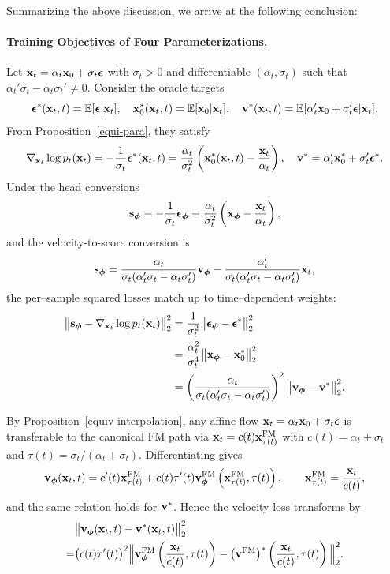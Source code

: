 Summarizing the above discussion, we arrive at the following conclusion:



\paragraph{Training Objectives of Four Parameterizations.}
Let ${\mathbf{x}}_t=\alpha_t {\mathbf{x}}_0+\sigma_t {\bm{\epsilon}}$ with $\sigma_t>0$ and differentiable $(\alpha_t,\sigma_t)$ such that $\alpha_t'\sigma_t-\alpha_t\sigma_t'\neq 0$. Consider the oracle targets
\[
{\bm{\epsilon}}^*({\mathbf{x}}_t,t)=\mathbb{E}[{\bm{\epsilon}}|{\mathbf{x}}_t],\quad 
{\mathbf{x}}_0^*({\mathbf{x}}_t,t)=\mathbb{E}[{\mathbf{x}}_0|{\mathbf{x}}_t],\quad
{\mathbf{v}}^*({\mathbf{x}}_t,t)=\mathbb{E}[\alpha_t'{\mathbf{x}}_0+\sigma_t'{\bm{\epsilon}}|{\mathbf{x}}_t].
\]
From Proposition~\ref{equi-para}, they satisfy
\[
\nabla_{{\mathbf{x}}_t}\log p_t({\mathbf{x}}_t)
= -\frac{1}{\sigma_t} {\bm{\epsilon}}^*({\mathbf{x}}_t,t)
= \frac{\alpha_t}{\sigma_t^2} \left({\mathbf{x}}_0^*({\mathbf{x}}_t,t)-\frac{{\mathbf{x}}_t}{\alpha_t}\right),
\quad
{\mathbf{v}}^*=\alpha_t' {\mathbf{x}}_0^*+\sigma_t' {\bm{\epsilon}}^*.
\]
Under the head conversions
\[
{\mathbf{s}}_{{\bm{\phi}}} \equiv -\frac{1}{\sigma_t} {\bm{\epsilon}}_{{\bm{\phi}}}
\equiv \frac{\alpha_t}{\sigma_t^2} \left({\mathbf{x}}_{{\bm{\phi}}}-\frac{{\mathbf{x}}_t}{\alpha_t}\right),
\]
and the velocity-to-score conversion is
\[
{\mathbf{s}}_{{\bm{\phi}}}
= \frac{\alpha_t}{\sigma_t(\alpha_t'\sigma_t-\alpha_t\sigma_t')} {\mathbf{v}}_{{\bm{\phi}}}
- \frac{\alpha_t'}{\sigma_t(\alpha_t'\sigma_t-\alpha_t\sigma_t')} {\mathbf{x}}_t,
\]
the per–sample squared losses match up to time–dependent weights:
\begin{align}\label{eq:s-e-x-v-equi}
\begin{aligned}
\big\|{\mathbf{s}}_{{\bm{\phi}}}-\nabla_{{\mathbf{x}}_t}\log p_t({\mathbf{x}}_t)\big\|_2^2
&=\frac{1}{\sigma_t^2} \big\|{\bm{\epsilon}}_{{\bm{\phi}}}-{\bm{\epsilon}}^*\big\|_2^2 \\
&=\frac{\alpha_t^2}{\sigma_t^4} \big\|{\mathbf{x}}_{{\bm{\phi}}}-{\mathbf{x}}_0^*\big\|_2^2 \\
&=\left(\frac{\alpha_t}{\sigma_t(\alpha_t'\sigma_t-\alpha_t\sigma_t')}\right)^{ 2}
\big\|{\mathbf{v}}_{{\bm{\phi}}}-{\mathbf{v}}^*\big\|_2^2 .
\end{aligned}
\end{align}

By Proposition~\ref{equiv-interpolation}, any affine flow ${\mathbf{x}}_t=\alpha_t{\mathbf{x}}_0+\sigma_t{\bm{\epsilon}}$
is transferable to the canonical FM path via ${\mathbf{x}}_t=c(t){\mathbf{x}}^{\mathrm{FM}}_{\tau(t)}$ with
$c(t)=\alpha_t+\sigma_t$ and $\tau(t)=\sigma_t/(\alpha_t+\sigma_t)$. Differentiating gives
\[
{\mathbf{v}}_{{\bm{\phi}}}({\mathbf{x}}_t,t)=c'(t){\mathbf{x}}^{\mathrm{FM}}_{\tau(t)}
+c(t)\tau'(t){\mathbf{v}}^{\mathrm{FM}}_{{\bm{\phi}}} \left({\mathbf{x}}_{\tau(t)}^{\mathrm{FM}},\tau(t)\right),
\qquad
{\mathbf{x}}_{\tau(t)}^{\mathrm{FM}}=\frac{{\mathbf{x}}_t}{c(t)},
\]
and the same relation holds for ${\mathbf{v}}^*$. Hence the velocity loss transforms by
\begin{align*}
    &\big\|{\mathbf{v}}_{{\bm{\phi}}}({\mathbf{x}}_t,t)-{\mathbf{v}}^*({\mathbf{x}}_t,t)\big\|_2^2
\\= &\big(c(t) \tau'(t)\big)^2
\Big\|{\mathbf{v}}^{\mathrm{FM}}_{{\bm{\phi}}} \left(\frac{{\mathbf{x}}_t}{c(t)},\tau(t)\right)
-\big({\mathbf{v}}^{\mathrm{FM}}\big)^* \left(\frac{{\mathbf{x}}_t}{c(t)},\tau(t)\right)\Big\|_2^2.
\end{align*}

